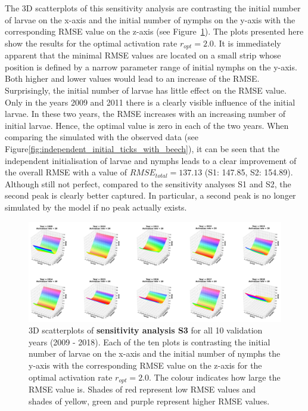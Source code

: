 \documentclass[a4paper, 11pt]{scrartcl}
\begin{document}
The 3D scatterplots of this sensitivity analysis are contrasting the initial number of larvae on the x-axis and the initial number of nymphs on the y-axis with the corresponding
RMSE value on the z-axis (see Figure~\ref{fig:independent_initial_ticks_with_beech_error}). The plots presented here show the results for the optimal activation rate
$r_{opt}= 2.0$. It is immediately apparent that the minimal RMSE values are located on a small strip whose position is defined by a narrow parameter range of initial nymphs on the
y-axis. Both higher and lower values would lead to an increase of the RMSE. Surprisingly, the initial number of larvae has little effect on the RMSE value. Only in the years
2009 and 2011 there is a clearly visible influence of the initial larvae. In these two years, the RMSE increases with an increasing number of initial larvae. Hence, the optimal
value is zero in each of the two years.
When comparing the simulated with the observed data (see Figure\ref{fig:independent_initial_ticks_with_beech}), it can be seen that the independent initialisation of larvae and
nymphs leads to a clear improvement of the overall RMSE with a value of $RMSE_{total} = 137.13$ (S1: 147.85, S2: 154.89). Although still not perfect, compared to the sensitivity
analyses S1 and S2, the second peak is clearly better captured. In particular, a second peak is no longer simulated by the model if no peak actually exists.

\clearpage

\begin{figure}[h!]
\centering
\includegraphics[width=\linewidth]{figures/independent_initial_ticks_with_beech_error}
\caption{3D scatterplots of \textbf{sensitivity analysis S3} for all 10 validation years (2009 - 2018). Each of the ten plots is contrasting the initial number of larvae on the
x-axis and the initial number of nymphs the y-axis with the corresponding RMSE value on the z-axis for the optimal activation rate $r_{opt} = 2.0$. The colour indicates how large
the RMSE value is. Shades of red represent low RMSE values and shades of yellow, green and purple represent higher RMSE values.}
\label{fig:independent_initial_ticks_with_beech_error}
\end{figure}
\end{document}
